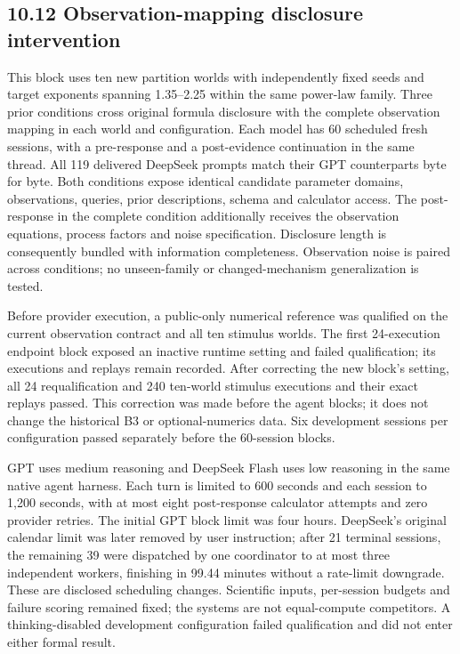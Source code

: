 \documentclass[10pt,twocolumn]{article}
\begin{document}
\subsection{10.12 Observation-mapping disclosure
intervention}\label{observation-mapping-disclosure-intervention}

This block uses ten new partition worlds with independently fixed seeds
and target exponents spanning 1.35--2.25 within the same power-law
family. Three prior conditions cross original formula disclosure with
the complete observation mapping in each world and configuration. Each
model has 60 scheduled fresh sessions, with a pre-response and a
post-evidence continuation in the same thread. All 119 delivered
DeepSeek prompts match their GPT counterparts byte for byte. Both
conditions expose identical candidate parameter domains, observations,
queries, prior descriptions, schema and calculator access. The
post-response in the complete condition additionally receives the
observation equations, process factors and noise specification.
Disclosure length is consequently bundled with information completeness.
Observation noise is paired across conditions; no unseen-family or
changed-mechanism generalization is tested.

Before provider execution, a public-only numerical reference was
qualified on the current observation contract and all ten stimulus
worlds. The first 24-execution endpoint block exposed an inactive
runtime setting and failed qualification; its executions and replays
remain recorded. After correcting the new block's setting, all 24
requalification and 240 ten-world stimulus executions and their exact
replays passed. This correction was made before the agent blocks; it
does not change the historical B3 or optional-numerics data. Six
development sessions per configuration passed separately before the
60-session blocks.

GPT uses medium reasoning and DeepSeek Flash uses low reasoning in the
same native agent harness. Each turn is limited to 600 seconds and each
session to 1,200 seconds, with at most eight post-response calculator
attempts and zero provider retries. The initial GPT block limit was four
hours. DeepSeek's original calendar limit was later removed by user
instruction; after 21 terminal sessions, the remaining 39 were
dispatched by one coordinator to at most three independent workers,
finishing in 99.44 minutes without a rate-limit downgrade. These are
disclosed scheduling changes. Scientific inputs, per-session budgets and
failure scoring remained fixed; the systems are not equal-compute
competitors. A thinking-disabled development configuration failed
qualification and did not enter either formal result.
\end{document}
